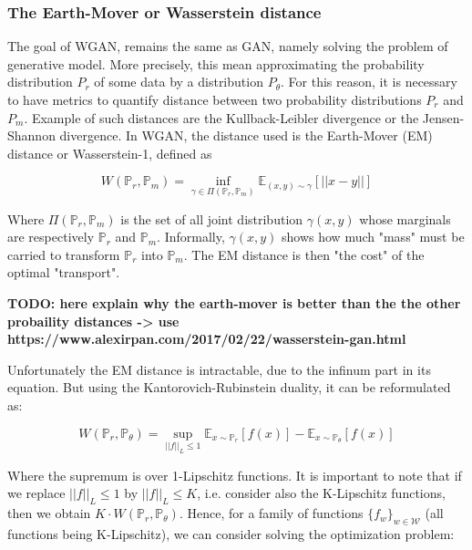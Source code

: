 \documentclass{article}
\begin{document}
\subsubsection{The Earth-Mover or Wasserstein distance}


The goal of WGAN, remains the same as GAN, namely solving the problem of generative model. More precisely, this mean approximating the probability distribution $P_r$ of some data by a distribution $P_{\theta}$. For this reason, it is necessary to have metrics to quantify distance between two probability distributions $P_r$ and $P_m$. Example of such distances are the Kullback-Leibler divergence or the Jensen-Shannon divergence. In WGAN, the distance used is the Earth-Mover (EM) distance or Wasserstein-1, defined as 

\begin{equation}
    W(\mathbb{P}_r, \mathbb{P}_m) = \inf_{\gamma \in \Pi(\mathbb{P}_r, \mathbb{P}_m)} \mathbb{E}_{(x,y) \sim \gamma} [||x-y||]
\end{equation}

Where $\Pi(\mathbb{P}_r, \mathbb{P}_m)$ is the set of all joint distribution $\gamma(x,y)$ whose marginals are respectively $\mathbb{P}_r$ and $\mathbb{P}_m$. Informally, $\gamma(x,y)$ shows how much "mass" must be carried to transform $\mathbb{P}_r$ into $\mathbb{P}_m$. The EM distance is then "the cost" of the optimal "transport".

\textbf{TODO: here explain why the earth-mover is better than the the other probaility distances -> use https://www.alexirpan.com/2017/02/22/wasserstein-gan.html}

Unfortunately the EM distance is intractable, due to the infinum part in its equation. But using the Kantorovich-Rubinstein duality, it can be reformulated as:



\begin{equation}
    W(\mathbb{P}_r, \mathbb{P}_{\theta}) = \sup_{||f||_L \leq 1} \mathbb{E}_{x \sim \mathbb{P}_r} [f(x)] - \mathbb{E}_{x \sim \mathbb{P}_{\theta}} [f(x)] 
\end{equation}

Where the supremum is over 1-Lipschitz functions. It is important to note that if we replace $||f||_L \leq 1$ by $||f||_L \leq K$, i.e. consider also the K-Lipschitz functions, then we obtain $K \cdot W(\mathbb{P}_r, \mathbb{P}_{\theta})$. Hence, for a family of functions $\{f_w\}_{w \in \mathcal{W}}$ (all functions being K-Lipschitz), we can consider solving the optimization problem:
\end{document}
